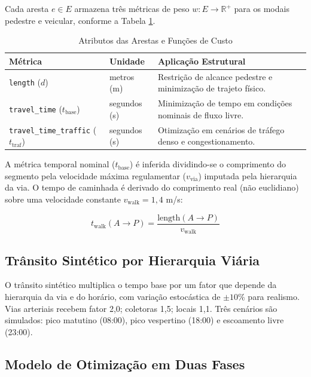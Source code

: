 \documentclass[conference]{IEEEtran}
\begin{document}
Cada aresta $e \in E$ armazena três métricas de peso $w: E \to \mathbb{R}^+$ para os modais pedestre e veicular, conforme a Tabela \ref{tab:pesos}.

\begin{table}[htbp]
\centering
\footnotesize
\setlength{\tabcolsep}{4pt}
\caption{Atributos das Arestas e Funções de Custo}
\label{tab:pesos}
\begin{tabular}{@{}>{\raggedright\arraybackslash}p{3.5cm}>{\raggedright\arraybackslash}p{2cm}>{\raggedright\arraybackslash}p{2.5cm}@{}}
\toprule
\textbf{Métrica} & \textbf{Unidade} & \textbf{Aplicação Estrutural} \\ \midrule
\texttt{length} ($d$) & metros (m) & Restrição de alcance pedestre e minimização de trajeto físico. \\
\texttt{travel\_time} ($t_{\text{base}}$) & segundos (s) & Minimização de tempo em condições nominais de fluxo livre. \\
\texttt{travel\_time\_traffic} ($t_{\text{traf}}$) & segundos (s) & Otimização em cenários de tráfego denso e congestionamento. \\ \bottomrule
\end{tabular}
\end{table}

A métrica temporal nominal ($t_{\text{base}}$) é inferida dividindo-se o comprimento do segmento pela velocidade máxima regulamentar ($v_{\text{via}}$) imputada pela hierarquia da via. O tempo de caminhada é derivado do comprimento real (não euclidiano) sobre uma velocidade constante $v_{\text{walk}} = 1{,}4$ m/s:

\begin{equation}
t_{\text{walk}}(A \to P) = \frac{\text{length}(A \to P)}{v_{\text{walk}}}
\label{eq:walktime}
\end{equation}

\subsection{Trânsito Sintético por Hierarquia Viária}

O trânsito sintético multiplica o tempo base por um fator que depende da hierarquia da via e do horário, com variação estocástica de $\pm 10\%$ para realismo. Vias arteriais recebem fator 2,0; coletoras 1,5; locais 1,1. Três cenários são simulados: pico matutino (08:00), pico vespertino (18:00) e escoamento livre (23:00).

\subsection{Modelo de Otimização em Duas Fases}
\end{document}
